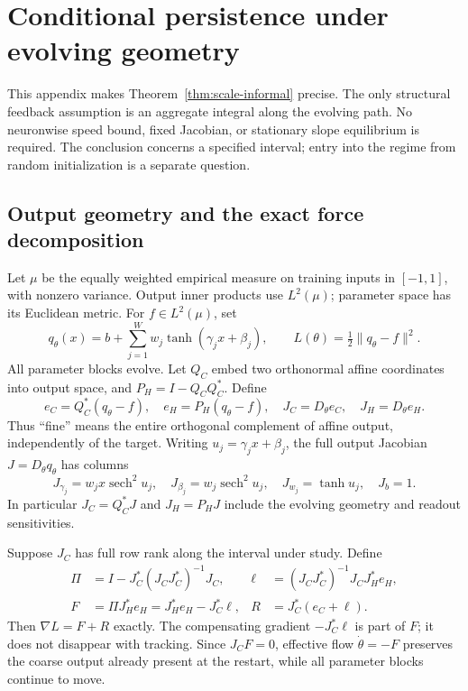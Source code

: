 \section{Conditional persistence under evolving geometry}
\label{app:scale-theory}

This appendix makes Theorem~\ref{thm:scale-informal} precise. The only
structural feedback assumption is an aggregate integral along the evolving
path. No neuronwise speed bound, fixed Jacobian, or stationary slope
equilibrium is required. The conclusion concerns a specified interval;
entry into the regime from random initialization is a separate question.

\subsection{Output geometry and the exact force decomposition}
Let $\mu$ be the equally weighted empirical measure on training inputs in
$[-1,1]$, with nonzero variance. Output inner products use $L^2(\mu)$;
parameter space has its Euclidean metric. For $f\in L^2(\mu)$, set
\begin{equation}
q_\theta(x)=b+\sum_{j=1}^W w_j\tanh(\gamma_jx+\beta_j),
\qquad L(\theta)=\tfrac12\|q_\theta-f\|^2.
\end{equation}
All parameter blocks evolve. Let $Q_C$ embed two orthonormal affine
coordinates into output space, and $P_H=I-Q_CQ_C^*$. Define
\begin{equation}
e_C=Q_C^*(q_\theta-f),\quad e_H=P_H(q_\theta-f),\quad
J_C=D_\theta e_C,\quad J_H=D_\theta e_H.
\end{equation}
Thus ``fine'' means the entire orthogonal complement of affine output,
independently of the target. Writing $u_j=\gamma_jx+\beta_j$, the full
output Jacobian $J=D_\theta q_\theta$ has columns
\begin{equation}
J_{\gamma_j}=w_jx\operatorname{sech}^2u_j,\quad
J_{\beta_j}=w_j\operatorname{sech}^2u_j,\quad
J_{w_j}=\tanh u_j,\quad J_b=1.
\end{equation}
In particular $J_C=Q_C^*J$ and $J_H=P_HJ$ include the evolving geometry
and readout sensitivities.

Suppose $J_C$ has full row rank along the interval under study. Define
\begin{equation}
\begin{aligned}
\Pi&=I-J_C^*(J_CJ_C^*)^{-1}J_C,
&\ell&=(J_CJ_C^*)^{-1}J_CJ_H^*e_H,\\
F&=\Pi J_H^*e_H=J_H^*e_H-J_C^*\ell,
&R&=J_C^*(e_C+\ell).
\end{aligned}
\label{eq:scale-decomposition}
\end{equation}
Then $\nabla L=F+R$ exactly. The compensating gradient $-J_C^*\ell$
is part of $F$; it does not disappear with tracking. Since $J_CF=0$,
effective flow $\dot\theta=-F$ preserves the coarse output already present
at the restart, while all parameter blocks continue to move.

